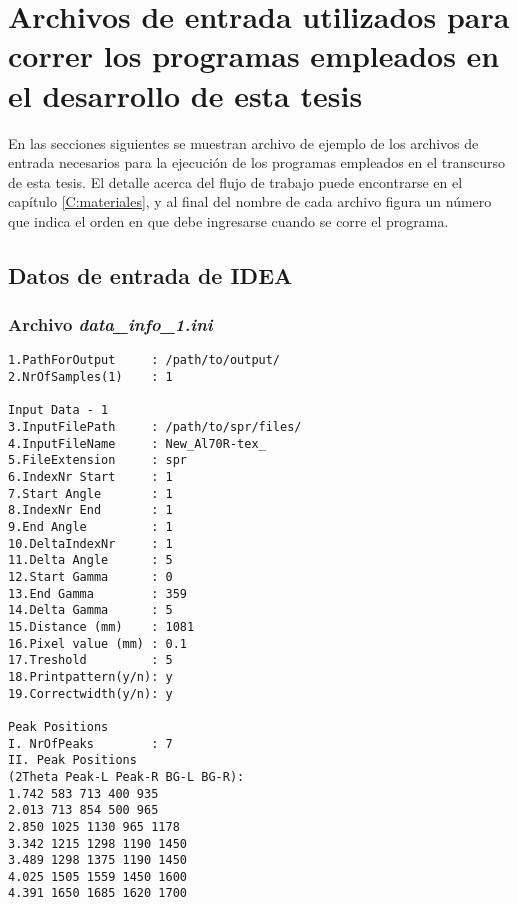 \chapter{Archivos de entrada utilizados para correr los programas empleados en el desarrollo de esta tesis}\label{CA:input}
\graphicspath{{figs/Apendice}}
En las secciones siguientes se muestran archivo de ejemplo de los archivos de entrada necesarios para la ejecución de los programas empleados en el transcurso de esta tesis.
El detalle acerca del flujo de trabajo puede encontrarse en el capítulo \ref{C:materiales}, y al final del nombre de cada archivo figura un número que indica el orden en que debe ingresarse cuando se corre el programa.
\section{Datos de entrada de IDEA}
\subsection*{Archivo \textit{data_info_1.ini}}
\begin{lstlisting}
1.PathForOutput     : /path/to/output/
2.NrOfSamples(1)    : 1

Input Data - 1
3.InputFilePath     : /path/to/spr/files/
4.InputFileName     : New_Al70R-tex_
5.FileExtension     : spr
6.IndexNr Start     : 1
7.Start Angle       : 1
8.IndexNr End       : 1
9.End Angle         : 1
10.DeltaIndexNr     : 1
11.Delta Angle      : 5
12.Start Gamma      : 0
13.End Gamma        : 359
14.Delta Gamma      : 5
15.Distance (mm)    : 1081
16.Pixel value (mm) : 0.1
17.Treshold         : 5
18.Printpattern(y/n): y
19.Correctwidth(y/n): y

Peak Positions
I. NrOfPeaks        : 7
II. Peak Positions
(2Theta Peak-L Peak-R BG-L BG-R):
1.742 583 713 400 935
2.013 713 854 500 965
2.850 1025 1130 965 1178
3.342 1215 1298 1190 1450
3.489 1298 1375 1190 1450
4.025 1505 1559 1450 1600
4.391 1650 1685 1620 1700
\end{lstlisting}


